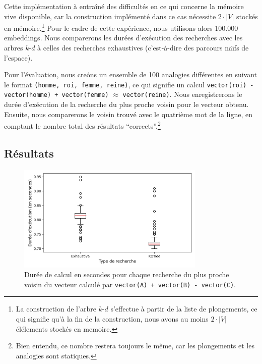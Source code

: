 \documentclass[12pt]{article}
\begin{document}
Cette implémentation à entraîné des difficultés en ce qui concerne la mémoire vive disponible, car la construction implémenté dans ce cas nécessite $2 \cdot |V|$ stockés en mémoire.\footnote{La construction de l'arbre $k$-$d$ s'effectue à partir de la liste de plongements, ce qui signifie qu'à la fin de la construction, nous avons au moins $2 \cdot |V|$ élélements stockés en memoire.} Pour le cadre de cette expérience, nous utilisons alors 100.000 embeddings. Nous comparerons les durées d'exécution des recherches avec les arbres $k$-$d$ à celles des recherches exhaustives (c'est-à-dire des parcours na\"\i fs de l'espace).


Pour l'évaluation, nous creóns un ensemble de 100 analogies différentes en suivant le format \texttt{(homme, roi, femme, reine)}, ce qui signifie un calcul \texttt{vector(roi) - vector(homme) + vector(femme)} $\approx$ \texttt{vector(reine)}. Nous enregistrerons le durée d'exécution de la recherche du plus proche voisin pour le vecteur obtenu. Ensuite, nous comparerons le voisin trouvé avec le quatrième mot de la ligne, en comptant le nombre total des résultats ``corrects''.\footnote{Bien entendu, ce nombre restera toujours le même, car les plongements et les analogies sont statiques.} 

\subsection{Résultats} \label{résultats-2}

\begin{figure}[htpb]
    \centering
    \includegraphics[width=0.8\textwidth]{img/times.png}
    \caption{Durée de calcul en secondes pour chaque recherche du plus proche voisin du vecteur calculé par \texttt{vector(A) + vector(B) - vector(C)}.}
    \label{fig:times}
\end{figure}
\end{document}
